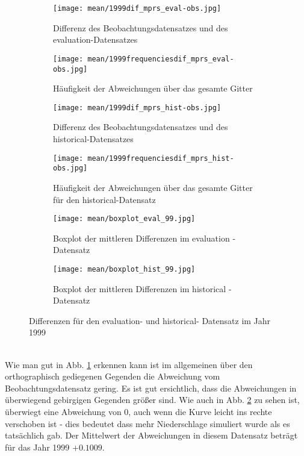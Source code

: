\begin{figure}[hbt!]
	\centering
	\begin{subfigure}{0.49\textwidth}
		\centering
		\texttt{[image: mean/1999dif\_mprs\_eval-obs.jpg]}
		\caption{Differenz des Beobachtungsdatensatzes und des evaluation-Datensatzes}
		\label{fig:eval_dif}
	\end{subfigure}
	\begin{subfigure}{0.49\textwidth}
		\centering
		\texttt{[image: mean/1999frequenciesdif\_mprs\_eval-obs.jpg]}
		\caption{Häufigkeit der Abweichungen über das gesamte Gitter}
		\label{fig:eval_freq_dif}
	\end{subfigure}
	\begin{subfigure}{0.49\textwidth}
		\centering
		\texttt{[image: mean/1999dif\_mprs\_hist-obs.jpg]}
		\caption{Differenz des Beobachtungsdatensatzes und des historical-Datensatzes}
		\label{fig:hist_dif}
	\end{subfigure}
	\begin{subfigure}{0.49\textwidth}
		\centering
		\texttt{[image: mean/1999frequenciesdif\_mprs\_hist-obs.jpg]}
		\caption{Häufigkeit der Abweichungen über das gesamte Gitter für den historical-Datensatz}
		\label{fig:hist_freq_dif}
	\end{subfigure}
	\begin{subfigure}{0.49\textwidth}
		\centering
		\texttt{[image: mean/boxplot\_eval\_99.jpg]}
		\caption{Boxplot der mittleren Differenzen im evaluation - Datensatz}
	\end{subfigure}
	\begin{subfigure}{0.49\textwidth}
		\centering
		\texttt{[image: mean/boxplot\_hist\_99.jpg]}
		\caption{Boxplot der mittleren Differenzen im historical - Datensatz}
	\end{subfigure}
	\caption{Differenzen für den evaluation- und historical- Datensatz im Jahr 1999}
\end{figure}
\\
Wie man gut in Abb. \ref{fig:eval_dif} erkennen kann ist im allgemeinen über den orthographisch gediegenen Gegenden die Abweichung vom Beobachtungsdatensatz gering. Es ist gut ersichtlich, dass die Abweichungen in überwiegend gebirgigen Gegenden größer sind. Wie auch in Abb. \ref{fig:eval_freq_dif} zu sehen ist, überwiegt eine Abweichung von 0, auch wenn die Kurve leicht ins rechte verschoben ist - dies bedeutet dass mehr Niederschlage simuliert wurde als es tatsächlich gab. Der Mittelwert der Abweichungen in diesem Datensatz beträgt für das Jahr 1999 $+0.1009$.\\
